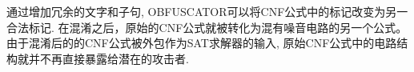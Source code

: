 %
%
%

通过增加冗余的文字和子句,
OBFUSCATOR可以将CNF公式中的标记改变为另一合法标记.
在混淆之后，原始的CNF公式就被转化为混有噪音电路的另一个公式。
由于混淆后的的CNF公式被外包作为SAT求解器的输入,
原始CNF公式中的电路结构就并不再直接暴露给潜在的攻击者.

